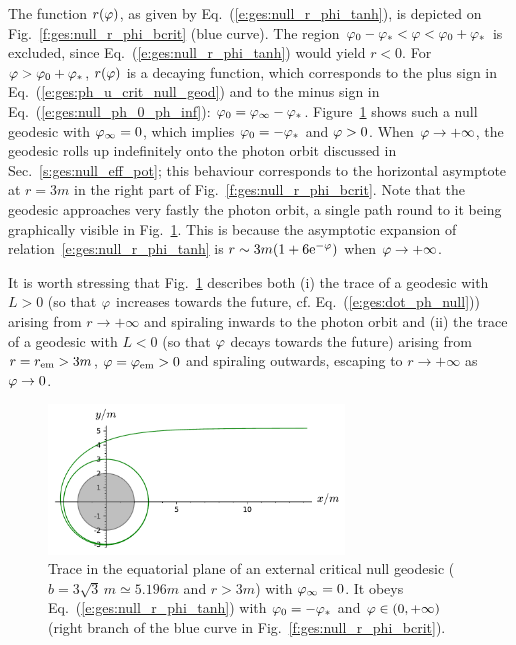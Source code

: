 The function $r(\varphi)$, as given by Eq.~(\ref{e:ges:null_r_phi_tanh}), is
depicted on Fig.~\ref{f:ges:null_r_phi_bcrit} (blue curve).
The region $\varphi_0-\varphi_* < \varphi < \varphi_0 + \varphi_*$ is excluded, since
Eq.~(\ref{e:ges:null_r_phi_tanh}) would yield $r<0$. For $\varphi > \varphi_0 + \varphi_*$,
$r(\varphi)$ is a decaying
function, which corresponds to the
plus sign in Eq.~(\ref{e:ges:ph_u_crit_null_geod}) and to the minus sign in
Eq.~(\ref{e:ges:null_ph_0_ph_inf}): $\varphi_0 = \varphi_\infty - \varphi_*$.
Figure~\ref{f:ges:null_b_crit_from_inf_L_pos} shows such a null geodesic with
$\varphi_\infty=0$, which implies $\varphi_0 = - \varphi_*$ and $\varphi>0$.
When $\varphi\to +\infty$, the geodesic rolls up indefinitely onto the photon
orbit discussed in Sec.~\ref{s:ges:null_eff_pot}; this
behaviour corresponds to the horizontal asymptote at $r=3m$ in
the right part of Fig.~\ref{f:ges:null_r_phi_bcrit}.
Note that the geodesic approaches very fastly the photon orbit, a single
path round to it being graphically visible in Fig.~\ref{f:ges:null_b_crit_from_inf_L_pos}.
This is because the asymptotic expansion of relation~\eqref{e:ges:null_r_phi_tanh} is
$r\sim 3m(1+ 6\mathrm{e}^{-\varphi})$ when $\varphi\to+\infty$.

It is worth stressing that Fig.~\ref{f:ges:null_b_crit_from_inf_L_pos} describes both (i) the trace of a
geodesic with $L>0$ (so that $\varphi$ increases towards the future, cf. Eq.~(\ref{e:ges:dot_ph_null})) arising from $r\to + \infty$
and spiraling inwards to the photon orbit
and (ii) the trace of a geodesic with $L<0$ (so that $\varphi$ decays towards the future)
arising from $r=r_{\rm em} > 3 m$, $\varphi=\varphi_{\rm em}>0$
and spiraling outwards, escaping to $r\to +\infty$ as $\varphi\to 0$.

\begin{figure}
\centerline{\includegraphics[width=0.7\textwidth]{ges_null_b_crit_from_inf_L_pos.pdf}}
\caption[]{\label{f:ges:null_b_crit_from_inf_L_pos} \footnotesize
Trace in the equatorial plane of an external critical null geodesic ($b = 3\sqrt{3} \, m \simeq 5.196 m$ and
$r>3m$) with $\varphi_\infty=0$.
It obeys Eq.~(\ref{e:ges:null_r_phi_tanh}) with $\varphi_0 = -\varphi_*$ and $\varphi\in(0,+\infty)$
(right branch of the blue curve in Fig.~\ref{f:ges:null_r_phi_bcrit}).}
\end{figure}

